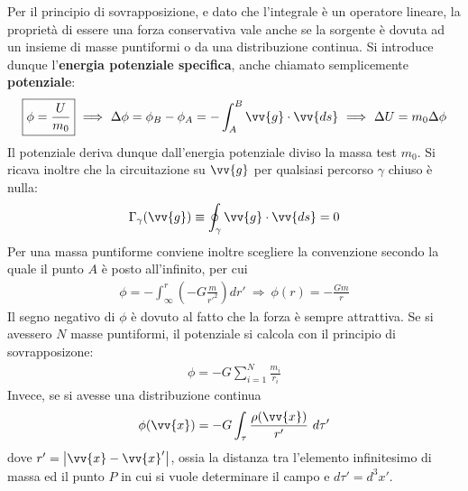\documentclass[a4paper, oneside]{book}
\begin{document}
Per il principio di sovrapposizione, e dato che l'integrale è un operatore lineare, 
la proprietà di essere una forza conservativa vale anche se
la sorgente è dovuta ad un insieme di masse puntiformi o da una distribuzione continua.
Si introduce dunque l'\textbf{energia potenziale specifica}, anche chiamato
semplicemente \textbf{potenziale}:
\begin{align}
    \boxed{\phi = \frac{U}{m_0}} \ \Longrightarrow \ \Delta \phi = \phi_B - \phi_A = -\int_{A}^{B}\vv{g} \cdot \vv{ds}  \ \Longrightarrow \ \Delta U = m_0\Delta \phi
\end{align}
Il potenziale deriva dunque dall'energia potenziale diviso la massa test $m_0$. Si ricava inoltre che la circuitazione su $\vv{g}$ per qualsiasi percorso $\gamma$ chiuso è nulla:
\begin{align}
    \Gamma_\gamma(\vv{g} ) \equiv \oint_\gamma \vv{g}\cdot \vv{ds} = 0  
\end{align} 
Per una massa puntiforme conviene inoltre scegliere la convenzione secondo la quale 
il punto $A$ è posto all'infinito, per cui
\begin{align}
    \phi = - \int_{\infty }^{r}\left(-G\frac{m}{r'^{2}}\right) dr' \ \Longrightarrow \ \phi(r) = - \frac{Gm}{r} 
\end{align}
Il segno negativo di $\phi$ è dovuto al fatto che la forza è sempre attrattiva. Se si avessero 
$N$ masse puntiformi, il potenziale si calcola con il principio di sovrapposizone:
\begin{align}
    \phi = - G \sum_{i = 1}^{N} \frac{m_i}{r_i} 
\end{align}
Invece, se si avesse una distribuzione continua
\begin{align}
    \phi(\vv{x} ) = -G \int_{\tau} \frac{\rho(\vv{x} )}{r'} \ d\tau' 
\end{align}
dove $r' = \left| \vv{x} - \vv{x}'   \right|$, ossia la distanza tra 
l'elemento infinitesimo di massa ed il punto $P$ in cui si vuole determinare 
il campo e $d\tau' = d^{3}x'$. 
\end{document}
